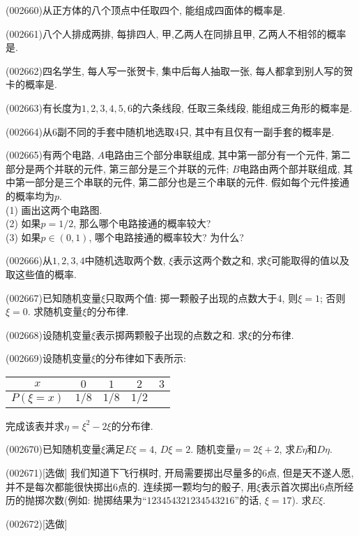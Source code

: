 \item (002660)从正方体的八个顶点中任取四个, 能组成四面体的概率是.
\item (002661)八个人排成两排, 每排四人, 甲,乙两人在同排且甲, 乙两人不相邻的概率是.
\item (002662)四名学生, 每人写一张贺卡, 集中后每人抽取一张, 每人都拿到别人写的贺卡的概率是.
\item (002663)有长度为$1,2,3,4,5,6$的六条线段, 任取三条线段, 能组成三角形的概率是.
\item (002664)从$6$副不同的手套中随机地选取$4$只, 其中有且仅有一副手套的概率是.
\item (002665)有两个电路, $A$电路由三个部分串联组成, 其中第一部分有一个元件, 第二部分是两个并联的元件, 第三部分是三个并联的元件; $B$电路由两个部并联组成, 其中第一部分是三个串联的元件, 第二部分也是三个串联的元件. 假如每个元件接通的概率均为$p$.\\ 
(1) 画出这两个电路图.\\ 
(2) 如果$p=1/2$, 那么哪个电路接通的概率较大?\\ 
(3) 如果$p\in (0,1)$, 哪个电路接通的概率较大? 为什么?
\item (002666)从$1,2,3,4$中随机选取两个数, $\xi$表示这两个数之和, 求$\xi$可能取得的值以及取这些值的概率.
\item (002667)已知随机变量$\xi$只取两个值: 掷一颗骰子出现的点数大于$4$, 则$\xi=1$; 否则$\xi=0$. 求随机变量$\xi$的分布律.
\item (002668)设随机变量$\xi$表示掷两颗骰子出现的点数之和. 求$\xi$的分布律.
\item (002669)设随机变量$\xi$的分布律如下表所示:
\begin{center}\begin{tabular}{|c|c|c|c|c|}
\hline
$x$ & $0$ & $1$ & $2$ & $3$\\\hline
$P(\xi=x)$ & $1/8$ & $1/8$ & $1/2$ & \phantom{$1/4$}\\\hline
\end{tabular}\end{center}
完成该表并求$\eta=\xi^2-2\xi$的分布律.
\item (002670)已知随机变量$\xi$满足$E\xi=4$, $D\xi=2$. 随机变量$\eta=2\xi+2$, 求$E\eta$和$D\eta$.
\item (002671)[选做]
我们知道下飞行棋时, 开局需要掷出尽量多的$6$点, 但是天不遂人愿, 并不是每次都能很快掷出$6$点的. 连续掷一颗均匀的骰子, 用$\xi$表示首次掷出$6$点所经历的抛掷次数(例如: 抛掷结果为``$123454321234543216$''的话, $\xi=17$). 求$E\xi$.
\item (002672)[选做]
